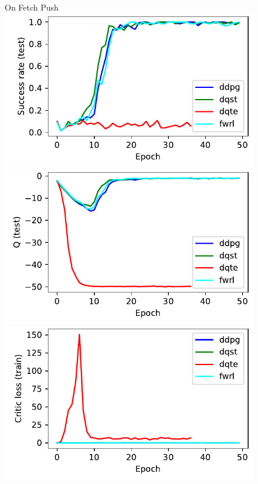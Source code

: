 %
\begin{figure}
  \def\frac{0.32}
  On Fetch Push\\
  \includegraphics[width=\frac\columnwidth]{media/res/38f4625-FetchPush-v1-fwrl-future/test/success_rate.pdf}%
  \includegraphics[width=\frac\columnwidth]{media/res/38f4625-FetchPush-v1-fwrl-future/test/mean_Q.pdf}%
  \includegraphics[width=\frac\columnwidth]{media/res/38f4625-FetchPush-v1-fwrl-future/train/critic_loss.pdf}\\

\end{figure}
